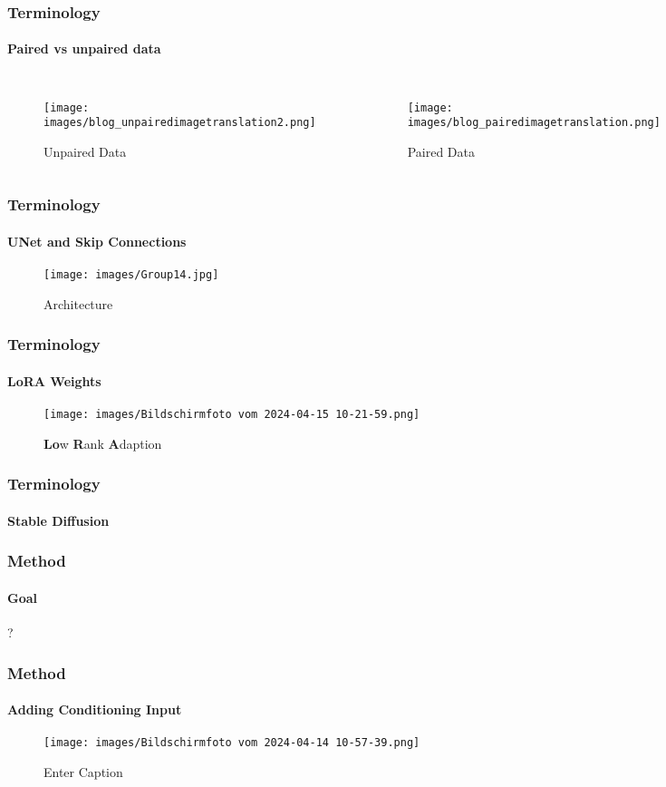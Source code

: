 \documentclass[aspectratio=169, lecture, amberg]{OTHAWbeamer}
\begin{document}
\begin{frame}
\frametitle{Terminology}
\framesubtitle{Paired vs unpaired data}
\begin{columns}
    \centering    
    \begin{figure}
        \texttt{[image: images/blog\_unpairedimagetranslation2.png]}
        \caption{Unpaired Data}
    \end{figure}

    \centering    
    \begin{figure}        
        \texttt{[image: images/blog\_pairedimagetranslation.png]}
        \caption{Paired Data}
    \end{figure}
  \end{columns}
\end{frame}

\begin{frame}
\frametitle{Terminology}
\framesubtitle{UNet and Skip Connections}
\begin{figure}
    \centering
    \texttt{[image: images/Group14.jpg]}
    \caption{Architecture}
\end{figure}
\end{frame}

\begin{frame}
\frametitle{Terminology}
\framesubtitle{LoRA Weights}
\begin{figure}
    \centering
    \texttt{[image: images/Bildschirmfoto vom 2024-04-15 10-21-59.png]}
    \caption{\textbf{Lo}w \textbf{R}ank \textbf{A}daption}
\end{figure}
\end{frame}

\begin{frame}
\frametitle{Terminology}
\framesubtitle{Stable Diffusion}

\end{frame}

\begin{frame}
\frametitle{Method}
\framesubtitle{Goal}
?
\end{frame}

\begin{frame}
\frametitle{Method}
\framesubtitle{Adding Conditioning Input}
\begin{figure}
    \centering
    \texttt{[image: images/Bildschirmfoto vom 2024-04-14 10-57-39.png]}
    \caption{Enter Caption}
\end{figure}
\end{frame}
\end{document}
